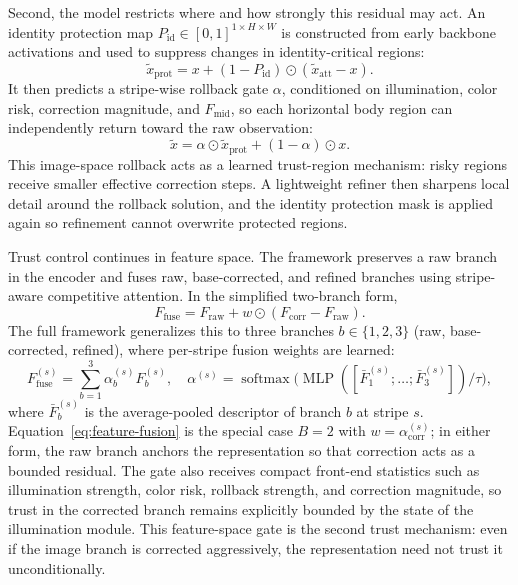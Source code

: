 \documentclass[sigconf,screen,review,anonymous]{acmart}
\begin{document}
Second, the model restricts where and how strongly this residual may act.
An identity protection map
$P_{\text{id}} \in [0,1]^{1 \times H \times W}$ is constructed from early
backbone activations and used to suppress changes in identity-critical regions:
\begin{equation}
  \tilde{x}_{\text{prot}}
  =
  x + (1 - P_{\text{id}}) \odot (\tilde{x}_{\text{att}} - x).
\end{equation}
It then predicts a stripe-wise rollback gate $\alpha$, conditioned on
illumination, color risk, correction magnitude, and $F_{\text{mid}}$, so each
horizontal body region can independently return toward the raw observation:
\begin{equation}
  \tilde{x}
  =
  \alpha \odot \tilde{x}_{\text{prot}} + (1-\alpha) \odot x.
\end{equation}
This image-space rollback acts as a learned trust-region mechanism: risky
regions receive smaller effective correction steps.
A lightweight refiner then sharpens local detail around the rollback solution,
and the identity protection mask is applied again so refinement cannot
overwrite protected regions.

Trust control continues in feature space.
The framework preserves a raw branch in the encoder and fuses raw, base-corrected, and
refined branches using stripe-aware competitive attention.
In the simplified two-branch form,
\begin{equation}
  F_{\text{fuse}}
  =
  F_{\text{raw}} + w \odot (F_{\text{corr}} - F_{\text{raw}}).
  \label{eq:feature-fusion}
\end{equation}
The full framework generalizes this to three branches
$b \in \{1,2,3\}$ (raw, base-corrected, refined), where per-stripe fusion
weights are learned:
\begin{equation}
  F_{\text{fuse}}^{(s)}
  =
  \sum_{b=1}^{3} \alpha_b^{(s)} F_b^{(s)},
  \quad
  \alpha^{(s)}
  =
  \operatorname{softmax}\!\bigl(\operatorname{MLP}([\bar{F}_1^{(s)};\ldots;\bar{F}_3^{(s)}])/\tau\bigr),
\end{equation}
where $\bar{F}_b^{(s)}$ is the average-pooled descriptor of branch $b$ at
stripe $s$.
Equation~\eqref{eq:feature-fusion} is the special case $B{=}2$ with
$w{=}\alpha_{\text{corr}}^{(s)}$; in either form, the raw branch anchors the
representation so that correction acts as a bounded residual.
The gate also receives compact front-end statistics such as illumination
strength, color risk, rollback strength, and correction magnitude, so trust in
the corrected branch remains explicitly bounded by the state of the
illumination module.
This feature-space gate is the second trust mechanism: even if the image branch
is corrected aggressively, the representation need not trust it
unconditionally.
\end{document}
